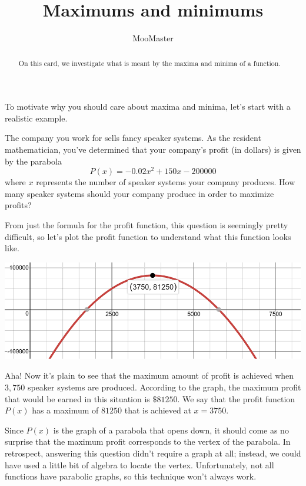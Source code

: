 \documentclass{ximera}
\title[Dig-In]{Maximums and minimums}
\author{MooMaster}
\begin{document}
\begin{abstract}
On this card, we investigate what is meant by the maxima and minima of a function.  
\end{abstract}
\maketitle

To motivate why you should care about maxima and minima, let's start with a realistic example. 

\begin{example}
The company you work for sells fancy speaker systems.  As the resident mathematician, you've determined that your company's profit (in dollars) is given by the parabola
\[ P(x) = -0.02x^2 + 150x-200000 \]
where $x$ represents the number of speaker systems your company produces.  How many speaker systems should your company produce in order to maximize profits? 
\begin{explanation}
From just the formula for the profit function, this question is seemingly pretty difficult, so let's plot the profit function to understand what this function looks like.  

\begin{center} \includegraphics[scale=0.5]{extrema1new.png} \end{center}

\underline{\hspace{5in}}

Aha!  Now it's plain to see that the maximum amount of profit is achieved when $3,750$ speaker systems are produced.  According to the graph, the maximum profit that would be earned in this situation is $\$81250$.  We say that the profit function $P(x)$ has a maximum of $81250$ that is achieved at $x=3750$.  

\begin{explanation}

Since $P(x)$ is the graph of a parabola that opens down, it should come as no surprise that the maximum profit corresponds to the vertex of the parabola.  In retrospect, answering this question didn't require a graph at all; instead, we could have used a little bit of algebra to locate the vertex.  Unfortunately, not all functions have parabolic graphs, so this technique won't always work. 

\end{explanation}

\end{explanation}
\end{example}
\end{document}

